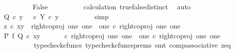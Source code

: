 \begin{isabellebody}
\ \ \ \ \ \ \isamarkupfalse%
\ \isamarkupfalse%
\ False\isanewline
\ \ \ \ \ \ \ \ \isamarkupfalse%
\ calculation\ true{\isacharunderscore}{\kern0pt}false{\isacharunderscore}{\kern0pt}distinct\ \isamarkupfalse%
\ auto\isanewline
\ \ \ \ \ \ \isamarkupfalse%
\ \isamarkupfalse%
\ {\isachardoublequoteopen}Q\ {\isasymcirc}\isactrlsub c\ y\ {\isacharequal}{\kern0pt}\ {\isacharparenleft}{\kern0pt}{\isasymt}\ {\isasymcirc}\isactrlsub c\ {\isasymbeta}\isactrlbsub Y\isactrlesub {\isacharparenright}{\kern0pt}\ {\isasymcirc}\isactrlsub c\ y{\isachardoublequoteclose}\isanewline
\ \ \ \ \ \ \ \ \isamarkupfalse%
\ simp\isanewline
\ \ \ \ \isamarkupfalse%
\isanewline
\ \ \ \ \ \ \isamarkupfalse%
\ {\isachardoublequoteopen}z\ {\isasymcirc}\isactrlsub c\ {\isasymlangle}x{\isacharcomma}{\kern0pt}y{\isasymrangle}\ {\isacharequal}{\kern0pt}\ right{\isacharunderscore}{\kern0pt}coproj\ one\ {\isacharparenleft}{\kern0pt}one\ {\isasymCoprod}\ one{\isacharparenright}{\kern0pt}\ {\isasymcirc}\isactrlsub c\ right{\isacharunderscore}{\kern0pt}coproj\ one\ one{\isachardoublequoteclose}\isanewline
\ \ \ \ \ \ \isamarkupfalse%
\ \isamarkupfalse%
\ {\isachardoublequoteopen}{\isacharparenleft}{\kern0pt}P\ {\isasymtimes}\isactrlsub f\ Q{\isacharparenright}{\kern0pt}\ {\isasymcirc}\isactrlsub c\ {\isasymlangle}x{\isacharcomma}{\kern0pt}y{\isasymrangle}\ {\isacharequal}{\kern0pt}\ {\isacharparenleft}{\kern0pt}{\isasymlangle}{\isasymt}{\isacharcomma}{\kern0pt}{\isasymt}{\isasymrangle}\ {\isasymamalg}\ {\isasymlangle}{\isasymf}{\isacharcomma}{\kern0pt}{\isasymf}{\isasymrangle}\ {\isasymamalg}\ {\isasymlangle}{\isasymf}{\isacharcomma}{\kern0pt}{\isasymt}{\isasymrangle}{\isacharparenright}{\kern0pt}\ {\isasymcirc}\isactrlsub c\ right{\isacharunderscore}{\kern0pt}coproj\ one\ {\isacharparenleft}{\kern0pt}one\ {\isasymCoprod}\ one{\isacharparenright}{\kern0pt}\ {\isasymcirc}\isactrlsub c\ right{\isacharunderscore}{\kern0pt}coproj\ one\ one{\isachardoublequoteclose}\isanewline
\ \ \ \ \ \ \ \ \isamarkupfalse%
\ {\isacharparenleft}{\kern0pt}typecheck{\isacharunderscore}{\kern0pt}cfuncs{\isacharcomma}{\kern0pt}\ typecheck{\isacharunderscore}{\kern0pt}cfuncs{\isacharunderscore}{\kern0pt}prems{\isacharcomma}{\kern0pt}\ smt\ comp{\isacharunderscore}{\kern0pt}associative{}\ z{\isacharunderscore}{\kern0pt}eq{\isacharparenright}{\kern0pt}\isanewline
\ \ \ \ \ \ \isamarkupfalse%

\end{isabellebody}
